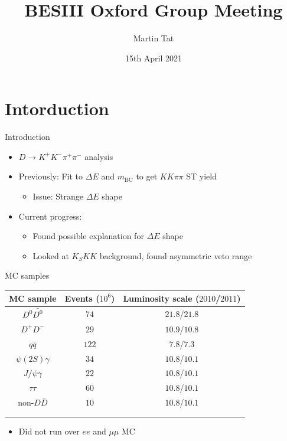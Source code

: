 \documentclass{beamer}
\title[BESIII Oxford]{BESIII Oxford Group Meeting}
\author{Martin Tat}
\institute{Oxford LHCb}
\date{15th April 2021}
\begin{document}
\begin{frame}
  \titlepage
\end{frame}


\section{Intorduction}
\begin{frame}{Introduction}
  \begin{itemize}
    \setlength\itemsep{2em}
    \item{$D\to K^+K^-\pi^+\pi^-$ analysis}
    \item{Previously: Fit to $\Delta E$ and $m_\text{BC}$ to get $KK\pi\pi$ ST yield}
    \begin{itemize}
      \item{Issue: Strange $\Delta E$ shape}
    \end{itemize}
    \item{Current progress:}
    \begin{itemize}
      \item{Found possible explanation for $\Delta E$ shape}
      \item{Looked at $K_SKK$ background, found asymmetric veto range}
    \end{itemize}
  \end{itemize}
\end{frame}

\begin{frame}{MC samples}
  \centering
  \begin{tabular}{ccc}
    MC sample & Events ($10^6$) & Luminosity scale ($2010$/$2011$) \\
    \hline
    $D^0\bar{D^0}$     & $74$   & $21.8$/$21.8$ \\
    $D^+D^-$           & $29$   & $10.9$/$10.8$ \\
    $q\bar{q}$         & $122$  & $7.8$/$7.3$   \\
    $\psi(2S)\gamma$   & $34$   & $10.8$/$10.1$ \\
    $J/\psi\gamma$     & $22$   & $10.8$/$10.1$ \\
    $\tau\tau$         & $60$   & $10.8$/$10.1$ \\
    non-$D\bar{D}$     & $10$   & $10.8$/$10.1$ \\ \\ \\
  \end{tabular}
  \begin{itemize}
    \item{Did not run over $ee$ and $\mu\mu$ MC}
  \end{itemize}
\end{frame}
\end{document}
